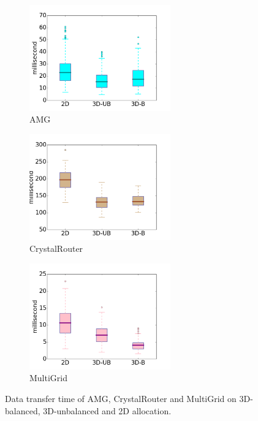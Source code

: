 \begin{figure}[t]
    \centering
    \begin{subfigure}[t]{0.32\textwidth}
        \centering
        \includegraphics[height=1.8in]{figs/intra-job/shapestudy/amg_box}
        \caption{AMG}
        \label{fig:shapstudy-amg}
    \end{subfigure}%
    \begin{subfigure}[t]{0.32\textwidth}
        \centering
        \includegraphics[height=1.8in]{figs/intra-job/shapestudy/cr_box}
        \caption{CrystalRouter}
        \label{fig:shapstudy-cr}
    \end{subfigure}
    \begin{subfigure}[t]{0.32\textwidth}
        \centering
        \includegraphics[height=1.8in]{figs/intra-job/shapestudy/mg_box}
        \caption{MultiGrid}
        \label{fig:shapstudy-mg}
    \end{subfigure}%
   \caption{
   Data transfer time of AMG, CrystalRouter and MultiGrid on 3D-balanced, 
   3D-unbalanced and 2D allocation.
   }
   \label{fig:shapestudy}
\end{figure}


